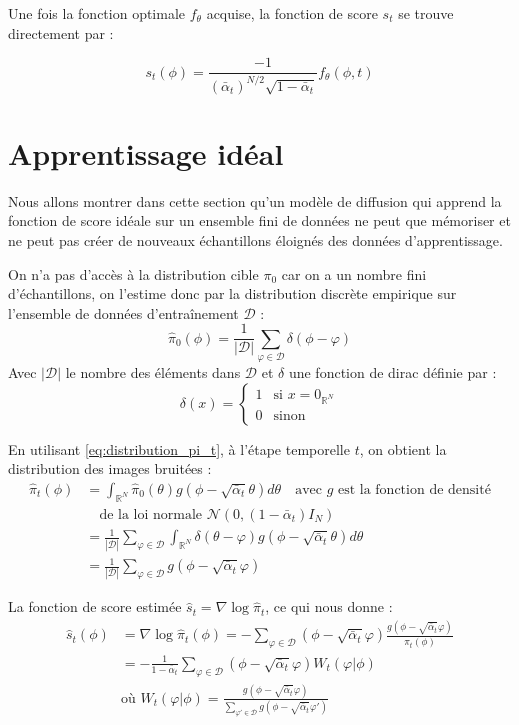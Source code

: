 \documentclass[a4paper,10pt]{article}
\theoremstyle{definition} %
\theoremstyle{definition} %
\theoremstyle{definition} %
\theoremstyle{definition} %
\begin{document}
Une fois la fonction optimale $f_\theta$ acquise, la fonction de score $s_t$ se trouve directement par :

\[
s_t(\phi) = \frac{-1}{(\bar \alpha_t)^{N/2} \sqrt{1-\bar{\alpha}_t}} f_\theta(\phi,t)
\]


\section{Apprentissage idéal}
Nous allons montrer dans cette section qu'un modèle de diffusion qui apprend la fonction de score idéale sur un ensemble fini de données ne peut que mémoriser et ne peut pas créer de nouveaux échantillons éloignés des données d'apprentissage.

On n'a pas d'accès à la distribution cible $\pi_0$ car on a un nombre fini d'échantillons, on l'estime donc par la distribution discrète empirique sur l'ensemble de données d'entraînement $\mathcal{D}$ :
\begin{equation*}
    \hat{\pi}_0(\phi) = \frac{1}{|\mathcal{D}|} \sum_{\varphi \in \mathcal{D}} \delta(\phi - \varphi)
\end{equation*}
Avec $|\mathcal{D}|$ le nombre des éléments dans $\mathcal{D}$ et $\delta$ une fonction de dirac définie par :
\[
\delta(x) = 
\begin{cases} 
1 & \text{si } x = 0_{\mathbb{R}^N} \\
0 & \text{sinon}
\end{cases}
\]

En utilisant \cref{eq:distribution_pi_t}, à l'étape temporelle $t$, on obtient la distribution des images bruitées :
\begin{align*}
\hat{\pi}_t(\phi) &= \int_{\mathbb{R}^N} \hat{\pi}_0(\theta) g(\phi - \sqrt{\bar \alpha_t}\theta) d\theta \quad \text{avec } g \text{ est la fonction de densité} \\
&\quad \text{de la loi normale } \mathcal{N}(0, (1-\bar \alpha_t)I_N) \\
&= \frac{1}{|\mathcal{D}|} \sum_{\varphi \in \mathcal{D}} \int_{\mathbb{R}^N} \delta(\theta - \varphi) g(\phi - \sqrt{\bar \alpha_t}\theta) d\theta \\
&= \frac{1}{|\mathcal{D}|} \sum_{\varphi \in \mathcal{D}} g(\phi - \sqrt{\bar \alpha_t}\varphi)
\end{align*}

La fonction de score estimée $\hat{s}_t = \nabla \log \hat{\pi}_t$, ce qui nous donne :
\begin{align*}
\hat{s}_t(\phi) &= \nabla \log \hat{\pi}_t(\phi) = -\sum_{\varphi \in \mathcal{D}} (\phi - \sqrt{\bar \alpha_t}\varphi) \frac{g(\phi - \sqrt{\bar \alpha_t}\varphi)}{\hat{\pi}_t(\phi)} \\
&= -\frac{1}{1-\bar \alpha_t} \sum_{\varphi \in \mathcal{D}} (\phi - \sqrt{\bar \alpha_t}\varphi) W_t(\varphi | \phi) \\
& \text{où }W_t(\varphi | \phi) = \frac{g(\phi - \sqrt{ \bar \alpha_t}\varphi)}{\sum_{\varphi' \in \mathcal{D}} g(\phi - \sqrt{\bar \alpha_t}\varphi')}
\end{align*}
\end{document}
